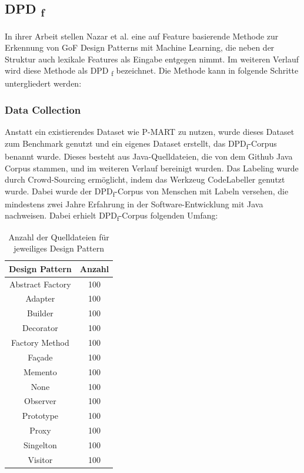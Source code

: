 \documentclass[conference]{IEEEtran}
\begin{document}
\newpage

\subsection{DPD \textsubscript{f}}

In ihrer Arbeit stellen Nazar et al. \cite{NAZAR2022111179} eine auf Feature basierende Methode zur Erkennung von GoF Design Patterns mit Machine Learning, die neben der Struktur auch lexikale Features als Eingabe entgegen nimmt. Im weiteren Verlauf wird diese Methode als DPD \textsubscript{f} bezeichnet.
Die Methode kann in folgende Schritte untergliedert werden:

\subsubsection*{Data Collection}
Anstatt ein existierendes Dataset wie P-MART zu nutzen, wurde dieses Dataset zum Benchmark genutzt und ein eigenes Dataset erstellt, das DPD\textsubscript{f}-Corpus benannt wurde.
Dieses besteht aus Java-Quelldateien, die von dem Github Java Corpus stammen, und im weiteren Verlauf bereinigt wurden.
Das Labeling wurde durch Crowd-Sourcing ermöglicht, indem das Werkzeug CodeLabeller genutzt wurde. Dabei wurde der DPD\textsubscript{f}-Corpus von Menschen mit Labeln versehen, die mindestens zwei Jahre Erfahrung in der Software-Entwicklung mit Java nachweisen.
Dabei erhielt DPD\textsubscript{f}-Corpus folgenden Umfang:

\begin{table}[h]
    \caption{Anzahl der Quelldateien für jeweiliges Design Pattern}
    \label{table:5}
    \centering
    \begin{tabular}{|c|c|}
        \hline
        Design Pattern   & Anzahl \\
        \hline
        Abstract Factory & 100    \\
        \hline
        Adapter          & 100    \\
        \hline
        Builder          & 100    \\
        \hline
        Decorator        & 100    \\
        \hline
        Factory Method   & 100    \\
        \hline
        Façade           & 100    \\
        \hline
        Memento          & 100    \\
        \hline
        None             & 100    \\
        \hline
        Observer         & 100    \\
        \hline
        Prototype        & 100    \\
        \hline
        Proxy            & 100    \\
        \hline
        Singelton        & 100    \\
        \hline
        Visitor          & 100    \\
        \hline
    \end{tabular}
\end{table}
\end{document}
